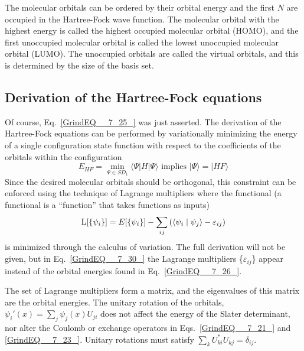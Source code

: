 \documentclass[11pt,oneside,final]{huthesis}%
\begin{document}
The molecular orbitals can be ordered by their orbital energy and the first $N$ are occupied in the Hartree-Fock wave function.  The molecular orbital with the highest energy is called the highest occupied molecular orbital (HOMO), and the first unoccupied molecular orbital is called the lowest unoccupied molecular orbital (LUMO).  The unoccupied orbitals are called the virtual orbitals, and this is determined by the size of the basis set.  

\subsection{Derivation of the Hartree-Fock equations}
Of course, Eq.~\eqref{GrindEQ__7_25_} was just asserted.   The derivation of the Hartree-Fock equations can be performed by variationally minimizing the energy of a single configuration state function with respect to the coefficients of the orbitals within the configuration 
\begin{equation*}%
E_{HF}=\min_{\Psi\in SD_1}\langle \Psi|H|\Psi\rangle \textrm{   implies } |\Psi\rangle=|HF\rangle
\end{equation*}
 Since the desired molecular orbitals should be orthogonal, this constraint can be enforced using the technique of Lagrange multipliers where the functional (a functional is a ``function'' that takes functions as inputs)
\begin{equation} \label{GrindEQ__7_30_} 
{\rm L}[\{ \psi _{i} \} ]=E[\{ \psi _{i} \} ]-\sum _{ij}\left({\left\langle \psi _{i}  \mathrel{\left| \vphantom{\psi _{i}  \psi _{j} }\right.\kern-\nulldelimiterspace} \psi _{j}  \right\rangle} -\varepsilon _{ij} \right)  
\end{equation} 
is minimized through the calculus of variation.  The full derivation will not be given, but in Eq.~\eqref{GrindEQ__7_30_} the Lagrange multipliers \{$\varepsilon _{ij} $\} appear instead of the orbital energies found in Eq.~\eqref{GrindEQ__7_26_}.

The set of Lagrange multipliers form a matrix, and the eigenvalues of this matrix are the orbital energies.  The unitary rotation of the orbitals, $\psi _{i} '(x)=\sum _{j}\psi _{j} (x)U_{ji}  $ does not affect the energy of the Slater determinant, nor alter the Coulomb or exchange operators in Eqs.~\eqref{GrindEQ__7_21_} and \eqref{GrindEQ__7_23_}.  Unitary rotations must satisfy $\sum _{k}U_{ki}^{*} U_{kj} =\delta _{ij}$. 
\end{document}

